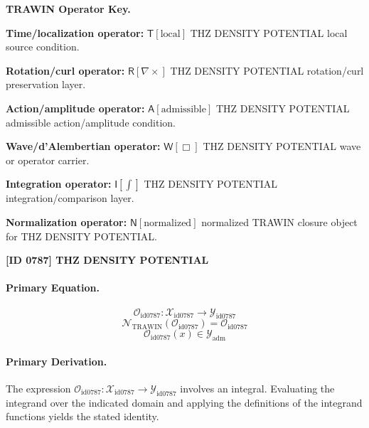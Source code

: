 \par\vspace{0.45\baselineskip}
\noindent\begin{minipage}[t]{\linewidth}
\begingroup
\small
\raggedright
\textbf{TRAWIN Operator Key.}\par
\noindent\textbf{Time/localization operator:} $\mathsf{T}\!\left[\mathrm{local}\right]$ THZ DENSITY POTENTIAL local source condition.\par
\noindent\textbf{Rotation/curl operator:} $\mathsf{R}\!\left[\nabla\times\right]$ THZ DENSITY POTENTIAL rotation/curl preservation layer.\par
\noindent\textbf{Action/amplitude operator:} $\mathsf{A}\!\left[\mathrm{admissible}\right]$ THZ DENSITY POTENTIAL admissible action/amplitude condition.\par
\noindent\textbf{Wave/d'Alembertian operator:} $\mathsf{W}\!\left[\Box\right]$ THZ DENSITY POTENTIAL wave or operator carrier.\par
\noindent\textbf{Integration operator:} $\mathsf{I}\!\left[\int\right]$ THZ DENSITY POTENTIAL integration/comparison layer.\par
\noindent\textbf{Normalization operator:} $\mathsf{N}\!\left[\mathrm{normalized}\right]$ normalized TRAWIN closure object for THZ DENSITY POTENTIAL.\par
\endgroup
\end{minipage}

\clearpage
\noindent\textbf{[ID 0787] THZ DENSITY POTENTIAL}\par
\vspace{0.35em}
\paragraph{Primary Equation.}
\[
\mathcal{O}_{\mathrm{id0787}}:\mathcal{X}_{\mathrm{id0787}}\longrightarrow\mathcal{Y}_{\mathrm{id0787}}
\]
\[
\mathcal{N}_{\mathrm{TRAWIN}}(\mathcal{O}_{\mathrm{id0787}})=\mathcal{O}_{\mathrm{id0787}}
\]
\[
\mathcal{O}_{\mathrm{id0787}}(x)\in\mathcal{Y}_{\mathrm{adm}}
\]

\paragraph{Primary Derivation.}
The expression \( \mathcal{O}_{\mathrm{id0787}}:\mathcal{X}_{\mathrm{id0787}}\longrightarrow\mathcal{Y}_{\mathrm{id0787}} \) involves an integral. Evaluating the integrand over the indicated domain and applying the definitions of the integrand functions yields the stated identity.
